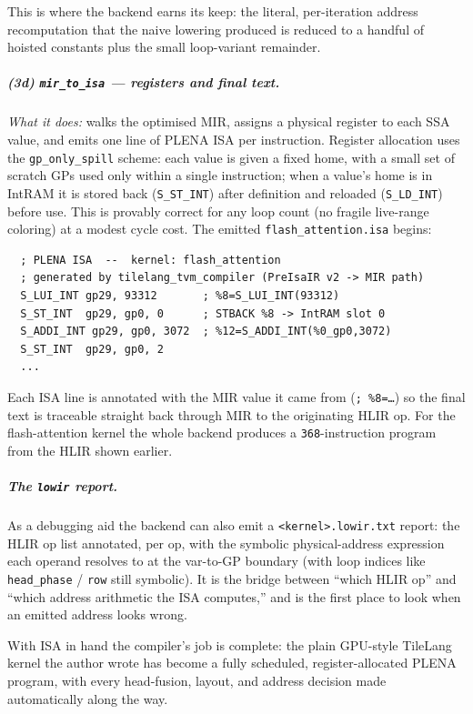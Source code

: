 \documentclass[
  10pt,
]{article}
\begin{document}
This is where the backend earns its keep: the literal, per-iteration
address recomputation that the naive lowering produced is reduced to a
handful of hoisted constants plus the small loop-variant remainder.

\subparagraph{(3d) \texttt{mir\_to\_isa} --- registers and final
text.}\label{be-isa} \emph{What it does:} walks the optimised MIR,
assigns a physical register to each SSA value, and emits one line of
PLENA ISA per instruction. Register allocation uses the
\texttt{gp\_only\_spill} scheme: each value is given a fixed home, with a
small set of scratch GPs used only within a single instruction; when a
value's home is in IntRAM it is stored back (\texttt{S\_ST\_INT}) after
definition and reloaded (\texttt{S\_LD\_INT}) before use. This is
provably correct for any loop count (no fragile live-range coloring) at a
modest cycle cost. The emitted \texttt{flash\_attention.isa} begins:

\begin{verbatim}
  ; PLENA ISA  --  kernel: flash_attention
  ; generated by tilelang_tvm_compiler (PreIsaIR v2 -> MIR path)
  S_LUI_INT gp29, 93312       ; %8=S_LUI_INT(93312)
  S_ST_INT  gp29, gp0, 0      ; STBACK %8 -> IntRAM slot 0
  S_ADDI_INT gp29, gp0, 3072  ; %12=S_ADDI_INT(%0_gp0,3072)
  S_ST_INT  gp29, gp0, 2
  ...
\end{verbatim}

Each ISA line is annotated with the MIR value it came from
(\texttt{; \%8=\dots}) so the final text is traceable straight back
through MIR to the originating HLIR op. For the flash-attention kernel
the whole backend produces a \texttt{368}-instruction program from the
HLIR shown earlier.

\subparagraph{The \texttt{lowir} report.}\label{be-lowir} As a debugging
aid the backend can also emit a \texttt{<kernel>.lowir.txt} report: the
HLIR op list annotated, per op, with the symbolic physical-address
expression each operand resolves to at the var-to-GP boundary (with loop
indices like \texttt{head\_phase} / \texttt{row} still symbolic). It is
the bridge between ``which HLIR op'' and ``which address arithmetic the
ISA computes,'' and is the first place to look when an emitted address
looks wrong.

With ISA in hand the compiler's job is complete: the plain GPU-style
TileLang kernel the author wrote has become a fully scheduled,
register-allocated PLENA program, with every head-fusion, layout, and
address decision made automatically along the way.
\end{document}
